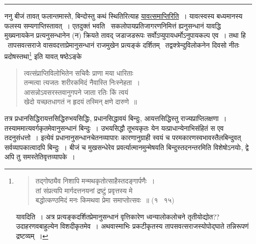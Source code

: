 \documentclass[11pt, openany]{book}
\begin{document}
\hrule

\vspace{2mm}
ननु बीजं तावत् फलान्तमास्ते, बिन्दोस्तु कथं स्थितिरित्याह \underline{यावत्समाप्तिरिति}~। यावत्स्वस्य बध्यमानस्य फलस्य सम्यगाप्तिस्तावत्~। एतदुक्तं भवति \textendash\ सकलोपायप्रतिजागरणनिमित्तं ह्यनुसन्धानं यावद्धि मुख्यनायकेन प्रत्यनुसन्धानेन (न) क्रियते तावद् जडाजडरूपः सर्वोऽप्युपायधर्मोऽनुपायकल्प एव~। तथा हि \textendash\ तापसवत्सराजे वासवदत्ताप्रेमानुसन्धानं राजमुखेन प्रत्यङ्कं दर्शितम् \textendash\ {\qt तद्वक्त्रेन्दुविलोकनेन दिवसो नीतः प्रदोषस्तथा}\renewcommand{\thefootnote}{*}\footnote{\begin{quote}
{\qt तद्गोष्ठ्यैव निशापि मन्मथकृतोत्साहैस्तदङ्गार्पणैः~।\\
तां संप्रत्यपि मार्गदत्तनयनां द्रष्टुं प्रवृत्तस्य मे\\
बद्धोत्कण्ठमिदं मनः किमथवा प्रेमा समाप्तोत्सवः~॥} (१ \textendash\ १५)
\end{quote}

यावदिति~। अत्र प्रत्यङ्कदर्शितप्रेमानुसन्धानं वृत्तिकारेण ध्वन्यालोकलोचने तृतीयोद्योत?? उदाहरणवबाहुल्येन विशदीकृतमेव~। अथवास्माभिः प्रकटीकृतस्य तापसवत्सराजस्योपोद्घाते तन्निरूपणं द्रष्टव्यम्~।} इति यावत् षष्ठेऽङ्के\textendash

\begin{quote}
{\qt त्वत्संप्राप्तिविलोभितेन सचिवैः प्राणा मया धारिताः\\
तन्मत्वा त्यजतः शरीरकमिदं नैवास्ति निःस्नेहता~।\\
आसन्नोऽवसरस्तवानुगपने जाता रतिः किं त्वयं\\
खेदो यच्छतधागतं न हृदयं तस्मिन् क्षणे दारुणे~॥}
\end{quote}

\noindent
तत्र प्रधानसिद्धिरायत्तसिद्धिरुभयसिद्धिः, प्रधानसिद्धावयं बिन्दुः, आयत्तसिद्धिस्तु राज्यप्राप्तिलक्षणा~। तस्याममात्यवर्गकृतमेवानुसन्धानं बिन्दुः~। उभयसिद्धौ तूभयकृतः येन यत्प्राधान्येनाभिसंहितं स एव तदनुसंधत्तो~। इत्येवं प्रधानानुसन्धानचेतनव्यापारः कारणानुग्राही स्वयं च परमकारणस्वभावस्तैलबिन्दुवत् सर्वव्यापकात्वादपि बिन्दुः~। बीजं च मुखसन्धेरेव प्रवर्त्यात्मानमुन्मेषयति बिन्दुस्तदनन्तरमिति विशेषोऽनयोः, द्वे अपि तु समस्तेतिवृत्तव्यापके~।

\newpage
\end{document}
